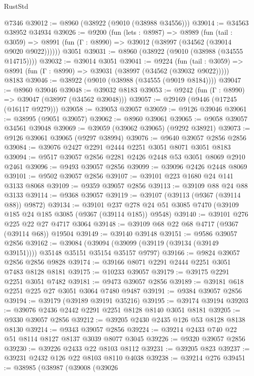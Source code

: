 \begin{lexlean}{RustStd}
\begin{coremodule}
    @7346
@39012 := @8960 (@38922 (@9010 (@38988 @34556)))
@39014 := @34563 @38952 @34934
@39026 := @9200
    (fun (lets : @8987) =>
    @8989
      (fun (tail : @3059) =>
      @8991 (fun (Γ : @8990) => @39012 (@38997 (@34562 (@39014 @9020 @9022))))))
    @3051
@39031 := @8960 (@38922 (@9010 (@38988 (@34555 @14715))))
@39032 := @39014 @3051
@39041 := @9224
    (fun (tail : @3059) => @8991 (fun (Γ : @8990) => @39031 (@38997 (@34562 (@39032 @9022)))))
    @8183
@39046 := @38922 (@9010 (@38988 (@34555 (@9019 @8184))))
@39047 := @8960 @39046
@39048 := @39032 @8183
@39053 := @9242 (fun (Γ : @8990) => @39047 (@38997 (@34562 @39048)))
@39057 := @29169 (@9446 (@17245 (@16117 @9279)))
@39058 := @39053 @39057
@39059 := @9126 @39046
@39061 := @38995 (@9051 @39057)
@39062 := @8960 @39061
@39065 := @9058 @39057 @34561 @39048
@39069 := @39059 (@39062 @39065) (@9292 @38921)
@39073 := @9126 @39061 @39065 (@9297 @38994)
@39076 := @9640 @39057 @2856 @2856
@39084 := @39076 @2427 @2291 @2444 @2251 @3051 @8071 @3051 @8183
@39094 := @9517 @39057 @2856 @2281 @2426 @2448 @53 @3051 @8069 @2910 @2461
@39096 := @9493 @39057 @2856
@39099 := @39096 @2426 @2448 @8069
@39101 := @9502 @39057 @2856
@39107 := @39101 @223 @1680 @24 @141 @3133 @8068
@39109 := @9359 @39057 @2856
@39113 := @39109 @88 @24 @88 @3133
@39114 := @9368 @39057
@39119 := @39107 (@39113 (@9367 (@39114 @88)) @9872)
@39134 := @39101
    @237
    @278
    @24
    @51
    @3085
    @7470
    (@39109 @185 @24 @185 @3085 (@9367 (@39114 @185)) @9548)
@39140 := @39101 @276 @225 @22 @27 @4717 @3064
@39148 := @39109 @68 @22 @68 @4717 (@9367 (@39114 @68)) @19504
@39149 := @39140 @39148
@39151 := @9586 @39057 @2856
@39162 := @39084
    (@39094 (@39099 (@39119 (@39134 (@39149 @39151)))) @35148 @35151 @35154 @35157 @9797)
@39166 := @9824 @39057 @2856 @2856 @9828
@39174 := @39166 @8071 @2291 @2444 @2251 @3051 @7483 @8128 @8181
@39175 := @10233 @39057
@39179 := @39175 @2291 @2251 @3051 @7482
@39181 := @9473 @39057 @2856
@39189 := @39181 @618 @2251 @225 @27 @3051 @3064 @7480 @9487
@39191 := @9384 @39057 @2856
@39194 := @39179 (@39189 @39191 @35216)
@39195 := @39174 @39194
@39203 := @39076 @2436 @2442 @2291 @2251 @8128 @8140 @3051 @8181
@39205 := @9330 @39057 @2856
@39212 := @39205 @2430 @2435 @126 @53 @8128 @8138 @8130
@39214 := @9343 @39057 @2856
@39224 := @39214 @2433 @740 @22 @51 @8114 @8127 @8137 @3039 @8077 @3045
@39226 := @9320 @39057 @2856
@39230 := @39226 @2433 @22 @8103 @8112
@39231 := @39205 @823
@39237 := @39231 @2432 @126 @22 @8103 @8110 @4038
@39238 := @39214 @276
@39451 := @38985
    (@38987
      (@39008
        (@39026

\end{coremodule}
\end{lexlean}
